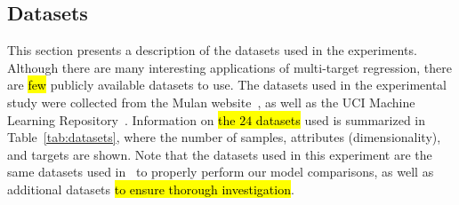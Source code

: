 \documentclass[preprint,12pt]{elsarticle}
\begin{document}
\subsection{Datasets}\label{subsec:data}
This section presents a description of the datasets used in the experiments. Although there are many interesting applications of multi-target regression, there are \hl{few} publicly available datasets to use. The datasets used in the experimental study were collected from the Mulan website~\cite{mulan}, as well as the UCI Machine Learning Repository~\cite{Lichman:2013}. Information on \hl{the $24$ datasets} used is summarized in Table~\ref{tab:datasets}, where the number of samples, attributes (dimensionality), and targets are shown. Note that the datasets used in this experiment are the same datasets used in~\cite{Spyromitros2014} to properly perform our model comparisons, as well as  additional datasets \hl{to ensure thorough investigation}. 
%
%
%
%
%
%
%
\end{document}

